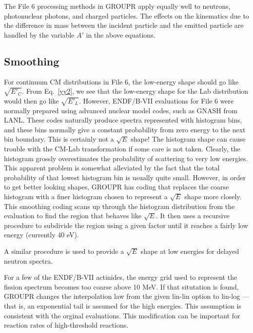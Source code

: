 The File 6 processing methods in GROUPR apply equally well to
neutrons, photonuclear photons, and charged particles.  The effects
on the kinematics due to the difference in mass between the incident
particle and the emitted particle are handled by the variable $A'$ in
the above equations.

\subsection{Smoothing}
\label{ssGROUPR_Smooth}

For continuum CM distributions in File 6, the low-energy shape
should go like $\sqrt{E'_C}$.  From Eq.~\ref{yy2},
we see that the low-energy shape for the Lab distribution would then go
like $\sqrt{E'_L}$.  However, ENDF/B-VII evaluations for File 6
were normally prepared using advanced nuclear model codes, such as
GNASH from LANL.  These
codes naturally produce spectra represented
with histogram bins, and these bins normally give a constant
probability from zero energy to the next bin boundary.  This
is certainly not a $\sqrt{E}$ shape!  The histogram shape can
cause trouble with the CM-Lab transformation if some care is not
taken.  Clearly, the histogram grossly overestimates the probability
of scattering to very low energies.  This apparent problem is somewhat
alleviated by the fact that the total probability of that lowest
histogram bin is usually quite small.  However, in order to get
better looking shapes, GROUPR has coding that replaces the
coarse histogram with a finer histogram chosen to represent a
$\sqrt{E}$ shape more closely.  This smoothing
coding scans up through the histogram distribution from the evaluation
to find the region that behaves like $\sqrt{E}$.  It then uses a
recursive procedure to subdivide the region using a given factor
until it reaches a fairly low energy (currently 40 eV).

A similar procedure is used to provide a $\sqrt{E}$ shape
at low energies for delayed neutron spectra.

For a few of the ENDF/B-VII actinides, the
energy grid used to represent the fission spectrum becomes too
coarse above 10 MeV.  If that situtation is found, GROUPR changes
the interpolation law from the given lin-lin option to
lin-log --- that is, an exponential tail is assumed for the
high energies.  This assumption is consistent with the orginal
evaluations.  This modification can be important for reaction
rates of high-threshold reactions.

